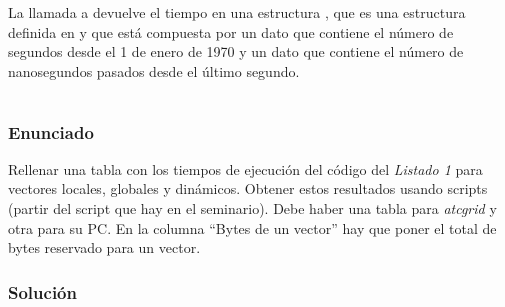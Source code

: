 La llamada a  devuelve el tiempo en una estructura , que es una estructura definida en  y que está compuesta por un dato  que contiene el número de segundos desde el 1 de enero de 1970 y un dato  que contiene el número de nanosegundos pasados desde el último segundo.

\section{}\label{ej1-7}

\subsubsection{Enunciado}

Rellenar una tabla con los tiempos de ejecución del código del \textit{Listado 1} para vectores locales, globales y dinámicos.
Obtener estos resultados usando scripts (partir del script que hay en el seminario).
Debe haber una tabla para \textit{atcgrid} y otra para su PC\@.
En la columna ``Bytes de un vector'' hay que poner el total de bytes reservado para un vector.

\subsubsection{Solución}

